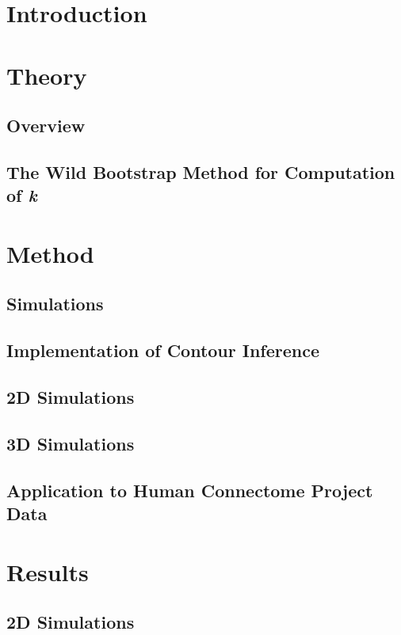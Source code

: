 \section{Introduction}

\section{Theory}

\subsection{Overview}

\subsection{The Wild Bootstrap Method for Computation of \textit{k}}

\section{Method}
 
\subsection{Simulations}

\subsection{Implementation of Contour Inference}

\subsection{2D Simulations}

\subsection{3D Simulations}

\subsection{Application to Human Connectome Project Data}

\section{Results}

\subsection{2D Simulations}

